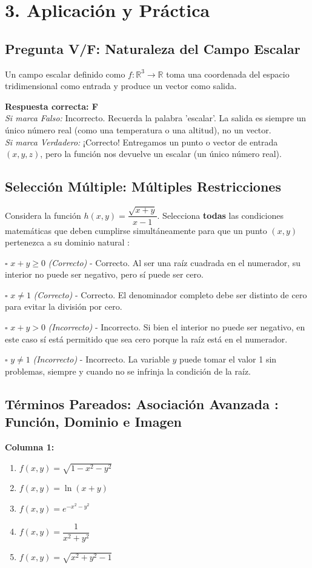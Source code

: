 \documentclass[11pt]{article}
\newenvironment{aplicacion}{%
  \section*{3. Aplicación y Práctica}%
}{}
\newenvironment{preguntaverdaderofalso}[1]{\subsection*{Pregunta V/F: #1}\par\vspace{0.1cm}}{\vspace{0.3cm}}
\newcommand{\verdaderofalso}[3]{\par\noindent\textbf{Respuesta correcta: #1} \\ \textit{Si marca Falso:} #2 \\ \textit{Si marca Verdadero:} #3\par\vspace{0.15cm}}
\newenvironment{preguntacasillas}[1]{\subsection*{Selección Múltiple: #1}\par\vspace{0.1cm}}{\vspace{0.3cm}}
\newcommand{\casilla}[3]{\par\noindent $\square$ \textbf{#1} \textit{(#2)} - #3\par\vspace{0.15cm}}
\newenvironment{pareadostrescolumnas}[1]{\subsection*{Términos Pareados: #1}}{\vspace{0.3cm}}
\newcommand{\columnaI}[1]{\textbf{Columna 1:}\begin{enumerate}#1\end{enumerate}}
\begin{document}
\begin{aplicacion}
  \begin{preguntaverdaderofalso}{Naturaleza del Campo Escalar}
    Un campo escalar definido como $f \colon \mathbb{R}^3 \to \mathbb{R}$ toma una coordenada del espacio tridimensional como entrada y produce un vector como salida.
    
\verdaderofalso{F}{Incorrecto. Recuerda la palabra 'escalar'. La salida es siempre un único número real (como una temperatura o una altitud), no un vector.}{¡Correcto! Entregamos un punto o vector de entrada $(x,y,z)$, pero la función nos devuelve un escalar (un único número real).}
  \end{preguntaverdaderofalso}

  \begin{preguntacasillas}{Múltiples Restricciones}
    Considera la función $h(x,y) = \dfrac{\sqrt{x+y}}{x-1}$. Selecciona \textbf{todas} las condiciones matemáticas que deben cumplirse simultáneamente para que un punto $(x,y)$ pertenezca a su dominio natural : \casilla{$x + y \geq 0$}{Correcto}{Correcto. Al ser una raíz cuadrada en el numerador, su interior no puede ser negativo, pero sí puede ser cero.}
    \casilla{$x \neq 1$}{Correcto}{Correcto. El denominador completo debe ser distinto de cero para evitar la división por cero.}
    \casilla{$x + y > 0$}{Incorrecto}{Incorrecto. Si bien el interior no puede ser negativo, en este caso sí está permitido que sea cero porque la raíz está en el numerador.}
    \casilla{$y \neq 1$}{Incorrecto}{Incorrecto. La variable $y$ puede tomar el valor 1 sin problemas, siempre y cuando no se infrinja la condición de la raíz.}
  \end{preguntacasillas}




  \begin{pareadostrescolumnas}{Asociación Avanzada : Función, Dominio e Imagen}
    
    \columnaI{
      \item $f(x,y) = \sqrt{1 - x^2 - y^2}$
      \item $f(x,y) = \ln(x + y)$
      \item $f(x,y) = e^{-x^2 - y^2}$
      \item $f(x,y) = \dfrac{1}{x^2 + y^2}$
      \item $f(x,y) = \sqrt{x^2 + y^2 - 1}$
    }
    

\end{pareadostrescolumnas}
\end{aplicacion}
\end{document}

